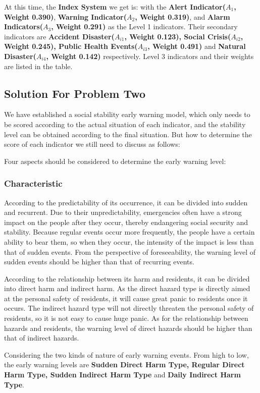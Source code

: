 \documentclass[12pt]{article}  %
\begin{document}
At this time, the \textbf{Index System} we get is: with the \textbf{Alert Indicator($A_1$, Weight 0.390)}, \textbf{Warning Indicator($A_2$, Weight 0.319)}, and \textbf{Alarm Indicators($A_3$, Weight 0.291)} as the Level 1 indicators. Their secondary indicators are \textbf{Accident Disaster($A_{i1}$, Weight 0.123), Social Crisis($A_{i2}$, Weight 0.245), Public Health Events($A_{i3}$, Weight 0.491) }and \textbf{Natural Disaster($A_{i4}$, Weight 0.142)} respectively. Level 3 indicators and their weights are listed in the table.
\subsection{Solution For Problem Two}
We have established a social stability early warning model, which only needs to be scored according to the actual situation of each indicator, and the stability level can be obtained according to the final situation. But how to determine the score of each indicator we still need to discuss as follows:

Four aspects should be considered to determine the early warning level:
\subsubsection{Characteristic}
According to the predictability of its occurrence, it can be divided into sudden and recurrent. Due to their unpredictability, emergencies often have a strong impact on the people after they occur, thereby endangering social security and stability. Because regular events occur more frequently, the people have a certain ability to bear them, so when they occur, the intensity of the impact is less than that of sudden events. From the perspective of foreseeability, the warning level of sudden events should be higher than that of recurring events.

According to the relationship between its harm and residents, it can be divided into direct harm and indirect harm. As the direct hazard type is directly aimed at the personal safety of residents, it will cause great panic to residents once it occurs. The indirect hazard type will not directly threaten the personal safety of residents, so it is not easy to cause huge panic. As for the relationship between hazards and residents, the warning level of direct hazards should be higher than that of indirect hazards.

Considering the two kinds of nature of early warning events. From high to low, the early warning levels are \textbf{Sudden Direct Harm Type, Regular Direct Harm Type, Sudden Indirect Harm Type} and \textbf{Daily Indirect Harm Type}.
\end{document}
